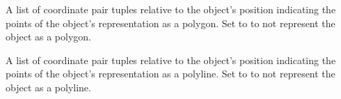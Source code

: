 \documentclass[letterpaper,10pt,english]{sphinxmanual}
\begin{document}
\begin{fulllineitems}
\begin{fulllineitems}
\end{fulllineitems}


\begin{fulllineitems}
\label{index:tmx.Object.polygon}
A list of coordinate pair tuples relative to the object's
position indicating the points of the object's representation as
a polygon.  Set to  to not represent the object as a
polygon.

\end{fulllineitems}


\begin{fulllineitems}
\label{index:tmx.Object.polyline}
A list of coordinate pair tuples relative to the object's
position indicating the points of the object's representation as
a polyline.  Set to  to not represent the object as
a polyline.

\end{fulllineitems}


\end{fulllineitems}

\end{document}
